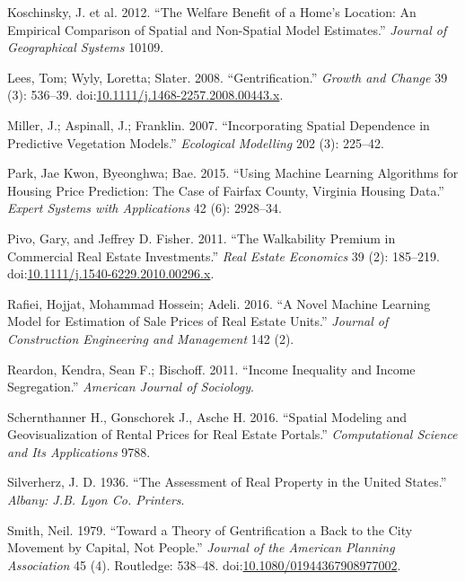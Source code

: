 \documentclass[]{article}
\begin{document}
\hypertarget{ref-Koschinsky2012}{}
Koschinsky, J. et al. 2012. ``The Welfare Benefit of a Home's Location:
An Empirical Comparison of Spatial and Non-Spatial Model Estimates.''
\emph{Journal of Geographical Systems} 10109.

\hypertarget{ref-Lees2008}{}
Lees, Tom; Wyly, Loretta; Slater. 2008. ``Gentrification.'' \emph{Growth
and Change} 39 (3): 536--39.
doi:\href{https://doi.org/10.1111/j.1468-2257.2008.00443.x}{10.1111/j.1468-2257.2008.00443.x}.

\hypertarget{ref-Miller2015}{}
Miller, J.; Aspinall, J.; Franklin. 2007. ``Incorporating Spatial
Dependence in Predictive Vegetation Models.'' \emph{Ecological
Modelling} 202 (3): 225--42.

\hypertarget{ref-Park2015}{}
Park, Jae Kwon, Byeonghwa; Bae. 2015. ``Using Machine Learning
Algorithms for Housing Price Prediction: The Case of Fairfax County,
Virginia Housing Data.'' \emph{Expert Systems with Applications} 42 (6):
2928--34.

\hypertarget{ref-Pivo2011}{}
Pivo, Gary, and Jeffrey D. Fisher. 2011. ``The Walkability Premium in
Commercial Real Estate Investments.'' \emph{Real Estate Economics} 39
(2): 185--219.
doi:\href{https://doi.org/10.1111/j.1540-6229.2010.00296.x}{10.1111/j.1540-6229.2010.00296.x}.

\hypertarget{ref-Rafiei2016}{}
Rafiei, Hojjat, Mohammad Hossein; Adeli. 2016. ``A Novel Machine
Learning Model for Estimation of Sale Prices of Real Estate Units.''
\emph{Journal of Construction Engineering and Management} 142 (2).

\hypertarget{ref-Reardon2011}{}
Reardon, Kendra, Sean F.; Bischoff. 2011. ``Income Inequality and Income
Segregation.'' \emph{American Journal of Sociology}.

\hypertarget{ref-Schernthanner2016}{}
Schernthanner H., Gonschorek J., Asche H. 2016. ``Spatial Modeling and
Geovisualization of Rental Prices for Real Estate Portals.''
\emph{Computational Science and Its Applications} 9788.

\hypertarget{ref-Silverherz1936}{}
Silverherz, J. D. 1936. ``The Assessment of Real Property in the United
States.'' \emph{Albany: J.B. Lyon Co. Printers}.

\hypertarget{ref-Smith1979}{}
Smith, Neil. 1979. ``Toward a Theory of Gentrification a Back to the
City Movement by Capital, Not People.'' \emph{Journal of the American
Planning Association} 45 (4). Routledge: 538--48.
doi:\href{https://doi.org/10.1080/01944367908977002}{10.1080/01944367908977002}.
\end{document}
